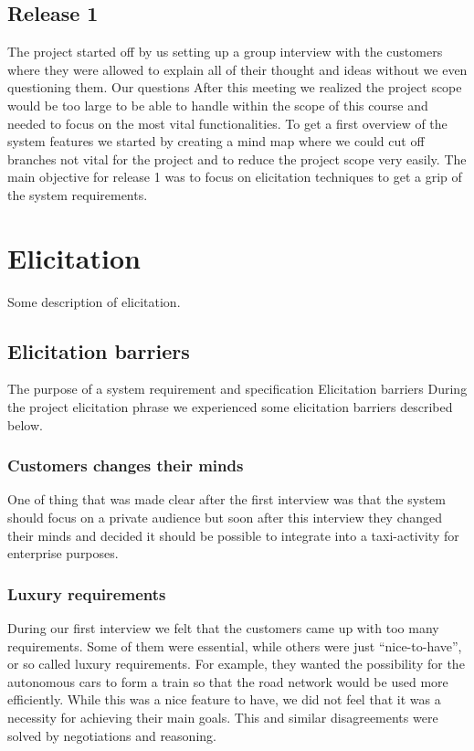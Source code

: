 \documentclass[10pt]{article}
\begin{document}
\subsection{Release 1}
The project started off by us setting up a group interview with the customers where they were allowed  to explain all of their thought and ideas without we even questioning them. Our questions After this meeting we realized the project scope would be too large to be able to handle within the scope of this course and needed to focus on the most vital functionalities.
To get a first overview of the system features we started by creating a mind map where we could cut off branches not vital for the project and to reduce the project scope very easily.
The main objective for release 1 was to focus on elicitation techniques to get a grip of the system requirements.

\section{Elicitation}
\sloppy
\noindent Some description of elicitation.
\subsection{Elicitation barriers}
The purpose of a system requirement and specification
Elicitation barriers
During the project elicitation phrase we experienced some elicitation barriers described below. 
\subsubsection{Customers changes their minds}
One of thing that was made clear after the first interview was that the system should focus on a private audience but soon after this interview they changed their minds and decided it should be possible to integrate into a taxi-activity for enterprise purposes.
\subsubsection{Luxury requirements}
During our first interview we felt that the customers came up with too many requirements. Some of them were essential, while others were just “nice-to-have”, or so called luxury requirements. For example, they wanted the possibility for the autonomous cars to form a train so that the road network would be used more efficiently. While this was a nice feature to have, we did not feel that it was a necessity for achieving their main goals. This and similar disagreements were solved by negotiations and reasoning. 
\end{document}
